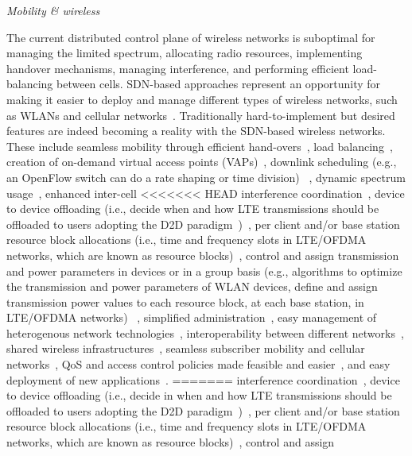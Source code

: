 \vspace{2mm}
\noindent \textit{Mobility \& wireless}

The current distributed control plane of wireless networks is suboptimal for managing the limited 
spectrum, allocating radio resources, implementing handover mechanisms, managing interference, and performing efficient load-balancing between cells.
SDN-based approaches represent an opportunity for making it easier to deploy and manage different types of wireless networks, such as WLANs and cellular 
networks~\cite{schulz-zander2014-atc,yap2010-1,ali-ahmad2013,gudipati2013,li2012,jin2013}.
Traditionally hard-to-implement but desired features are indeed becoming a reality with the SDN-based wireless networks. 
These include seamless mobility through efficient hand-overs~\cite{schulz-zander2014-atc,dely2011,li2012}, load balancing~\cite{schulz-zander2014-atc,gudipati2013}, creation of on-demand virtual access points (VAPs)~\cite{schulz-zander2014-atc,vestin2013}, downlink scheduling (e.g., an OpenFlow switch can do a rate shaping or time division) ~\cite{vestin2013}, dynamic spectrum usage~\cite{vestin2013}, enhanced inter-cell 
<<<<<<< HEAD
interference coordination~\cite{vestin2013,li2012}, device to device offloading (i.e., decide when and how LTE transmissions should be offloaded to users adopting the D2D paradigm~\cite{yang2013d2d})~\cite{ali-ahmad2013}, per client and/or base station resource block allocations (i.e.,  time and frequency slots in LTE/OFDMA networks, which are known as resource blocks)~\cite{gudipati2013,ali-ahmad2013,jin2013}, control and assign 
transmission and power parameters in devices or in a group basis (e.g., algorithms to optimize the transmission and power parameters of WLAN devices, define and assign transmission power values to each resource block, at each base station, in LTE/OFDMA networks) ~\cite{ali-ahmad2013,gudipati2013}, simplified administration~\cite{schulz-zander2014-atc,yap2010-1,gudipati2013}, easy management of heterogenous network technologies~\cite{yap2010-1,gudipati2013,yap2010-2}, interoperability between different networks~\cite{yap2010-2,jin2013}, shared wireless infrastructures~\cite{yap2010-2}, seamless subscriber mobility and cellular networks~\cite{li2012}, QoS and access control policies made feasible and easier~\cite{li2012,jin2013}, and easy deployment of new applications~\cite{schulz-zander2014-atc,gudipati2013,yap2010-2}. 
=======
interference coordination~\cite{vestin2013,li2012}, device to device offloading (i.e., decide in when and how LTE transmissions should be offloaded to users adopting the D2D paradigm~\cite{yang2013d2d})~\cite{ali-ahmad2013}, per client and/or base station resource block allocations (i.e.,  time and frequency slots in LTE/OFDMA networks, which are known as resource blocks)~\cite{gudipati2013,ali-ahmad2013,jin2013}, control and assign 
